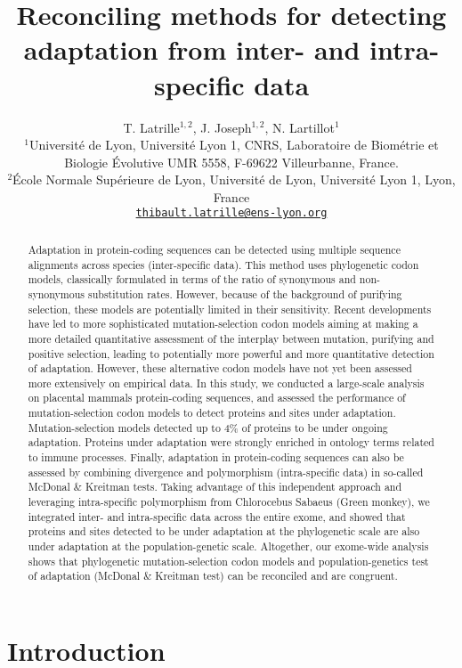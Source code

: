 \documentclass{article}
\title{Reconciling methods for detecting adaptation from inter- and intra-specific data}
\author{
	\large
	T. {Latrille}$^{1,2}$, J. Joseph$^{1,2}$, N. {Lartillot}$^{1}$ \\
	\normalsize
	$^{1}$Université de Lyon, Université Lyon 1, CNRS, Laboratoire de Biométrie et Biologie Évolutive UMR 5558, F-69622 Villeurbanne, France.\\
	$^{2}$École Normale Supérieure de Lyon, Université de Lyon, Université Lyon 1, Lyon, France\\
	\texttt{\href{mailto:thibault.latrille@ens-lyon.org}{thibault.latrille@ens-lyon.org}} \\
}
\begin{document}
\maketitle

\begin{abstract}
	Adaptation in protein-coding sequences can be detected using multiple sequence alignments across species (inter-specific data).
	This method uses phylogenetic codon models, classically formulated in terms of the ratio of synonymous and non-synonymous substitution rates.
	However, because of the background of purifying selection, these models are potentially limited in their sensitivity.
	Recent developments have led to more sophisticated mutation-selection codon models aiming at making a more detailed quantitative assessment of the interplay between mutation, purifying and positive selection, leading to potentially more powerful and more quantitative detection of adaptation.
	However, these alternative codon models have not yet been assessed more extensively on empirical data.
	In this study, we conducted a large-scale analysis on placental mammals protein-coding sequences, and assessed the performance of mutation-selection codon models to detect proteins and sites under adaptation.
	Mutation-selection models detected up to 4\% of proteins to be under ongoing adaptation.
	Proteins under adaptation were strongly enriched in ontology terms related to immune processes.
	Finally, adaptation in protein-coding sequences can also be assessed by combining divergence and polymorphism (intra-specific data) in so-called McDonal \& Kreitman tests.
	Taking advantage of this independent approach and leveraging intra-specific polymorphism from Chlorocebus Sabaeus (Green monkey), we integrated inter- and intra-specific data across the entire exome, and showed that proteins and sites detected to be under adaptation at the phylogenetic scale are also under adaptation at the population-genetic scale.
	Altogether, our exome-wide analysis shows that phylogenetic mutation-selection codon models and population-genetics test of adaptation (McDonal \& Kreitman test) can be reconciled and are congruent.
\end{abstract}


\section*{Introduction}
\end{document}
